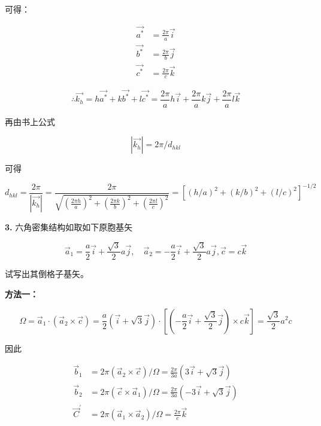 可得：

\begin{align*}
    \vec{a^*} &= \frac{2\pi}{a} \vec{i} \\
    \vec{b^*} &= \frac{2\pi}{b} \vec{j} \\
    \vec{c^*} &= \frac{2\pi}{c} \vec{k}
\end{align*}

\begin{equation*}
    \therefore \vec{k_h} = h \vec{a^*} + k \vec{b^*} + l \vec{c^*} = \frac{2\pi}{a} h \vec{i} + \frac{2\pi}{a} k \vec{j} + \frac{2\pi}{a} l \vec{k}
\end{equation*}

再由书上公式

\begin{equation*}
    |\vec{k_h}| = 2\pi / d_{hkl}
\end{equation*}

可得

\begin{equation*}
    d_{hkl} = \frac{2\pi}{|\vec{k_h}|} = \frac{2\pi}{\sqrt{\left(\frac{2\pi h}{a}\right)^2 + \left(\frac{2\pi k}{b}\right)^2 + \left(\frac{2\pi l}{c}\right)^2}} = \left[(h/a)^2 + (k/b)^2 + (l/c)^2\right]^{-1/2}
\end{equation*}

\noindent \textbf{3.\quad} 六角密集结构如取如下原胞基矢

\begin{equation*}
    \vec{a}_1 = \frac{a}{2} \vec{i} + \frac{\sqrt{3}}{2} a \vec{j}, \quad \vec{a}_2 = -\frac{a}{2} \vec{i} + \frac{\sqrt{3}}{2} a \vec{j}, \vec{c} = c \vec{k}
\end{equation*}

\noindent 试写出其倒格子基矢。

\noindent \textbf{方法一：}

\begin{equation*}
    \Omega = \vec{a}_1 \cdot (\vec{a}_2 \times \vec{c}) = \frac{a}{2} (\vec{i}+\sqrt{3}\vec{j}) \cdot \left[\left(-\frac{a}{2}\vec{i}+\frac{\sqrt{3}}{2}\vec{j}\right) \times c\vec{k}\right] = \frac{\sqrt{3}}{2} a^2 c
\end{equation*}

因此

\begin{align*}
    \vec{b}_1 &= 2\pi (\vec{a}_2 \times \vec{c}) / \Omega = \frac{2\pi}{3a} (3\vec{i}+\sqrt{3}\vec{j}) \\
    \vec{b}_2 &= 2\pi (\vec{c} \times \vec{a}_1) / \Omega = \frac{2\pi}{3a} (-3\vec{i}+\sqrt{3}\vec{j}) \\
    \vec{C}^\prime &= 2\pi (\vec{a}_1 \times \vec{a}_2) / \Omega = \frac{2\pi}{c} \vec{k}
\end{align*}

